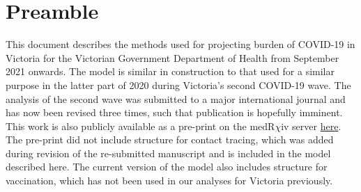 \section{Preamble}
This document describes the methods used for projecting burden of COVID-19 in Victoria for the Victorian Government Department of Health from September 2021 onwards.
The model is similar in construction to that used for a similar purpose in the latter part of 2020 during Victoria's second COVID-19 wave.
The analysis of the second wave was submitted to a major international journal and has now been revised three times, such that publication is hopefully imminent.
This work is also publicly available as a pre-print on the medR\(\chi\)iv server \href{https://www.medrxiv.org/content/10.1101/2021.04.03.21254866v2}{here}.
The pre-print did not include structure for contact tracing, which was added during revision of the re-submitted manuscript and is included in the model described here.
The current version of the model also includes structure for vaccination, which has not been used in our analyses for Victoria previously.